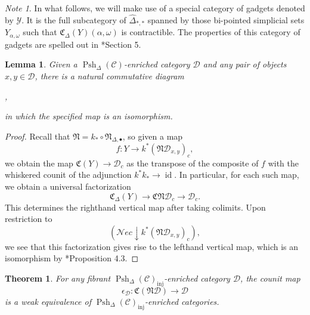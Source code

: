 \documentclass[leqno]{article}
\numberwithin{equation}{subsection}
\theoremstyle{plain}   %
\newtheorem{thm}[equation]{Theorem}
\newtheorem{lemma}[equation]{Lemma}
\theoremstyle{remark}
\newtheorem{note}[equation]{Note}
\theoremstyle{plain}
\DeclareMathOperator{\id}{id}
\DeclareMathOperator*{\coliml}{colim}
\newcommand{\Nec}{\ensuremath{{\mathcal{N}ec}}}
\newcommand{\overcat}[2]{{\left(#1\downarrow #2\right)}}
\newcommand{\psh}[1]{\ensuremath{\widehat{#1}}}
\newcommand{\spsh}{\ensuremath{\operatorname{Psh}_\Delta(\mathcal{C})}}
\begin{document}
\begin{note}
	In what follows, we will make use of a special category of gadgets denoted by \(\mathcal{Y}\).  It is the full subcategory of \(\psh{\Delta}_{\ast,\ast}\) spanned by those bi-pointed simplicial sets \(Y_{\alpha,\omega}\) such that \(\mathfrak{C}_\Delta(Y)(\alpha,\omega)\) is contractible.  The properties of this category of gadgets are spelled out in \cite{ds2}*{Section 5}.
\end{note}
\begin{lemma}\label{dssquare2}
	Given a \(\spsh\)-enriched category \(\mathcal{D}\) and any pair of objects \(x,y\in \mathcal{D}\), there is a natural commutative diagram
	\begin{center}
		,
	\end{center}
	in which the specified map is an isomorphism.
\end{lemma}
\begin{proof}
Recall that \(\mathfrak{N}=k_\ast \circ \mathfrak{N}_{\Delta,\bullet}\), so given a map \[f:Y\to k^\ast(\mathfrak{N}\mathcal{D}_{x,y})_c,\] we obtain the map \(\mathfrak{C}(Y)\to \mathcal{D}_c\) as the transpose of the composite of \(f\) with the whiskered counit of the adjunction \(k^\ast k_\ast \to \id\).   In particular, for each such map, we obtain a universal factorization \[\mathfrak{C}_\Delta(Y) \to \mathfrak{C}\mathfrak{N}\mathcal{D}_c\to \mathcal{D}_c.\] This determines the righthand vertical map after taking colimits.
Upon restriction to \[\overcat{\Nec}{k^\ast(\mathfrak{N}\mathcal{D}_{x,y})_c},\] we see that this factorization gives rise to the lefthand vertical map, which is an isomorphism by \cite{ds1}*{Proposition 4.3}.  
\end{proof}
\begin{thm}\label{counitthm}
  For any fibrant \(\spsh_{\mathrm{inj}}\)-enriched category \(\mathcal{D}\), the counit map
	\[\epsilon_\mathcal{D}:\mathfrak{C}(\mathfrak{N}\mathcal{D})\to \mathcal{D}\]
	is a weak equivalence of \(\spsh_{\mathrm{inj}}\)-enriched categories.
\end{thm}
\end{document}
